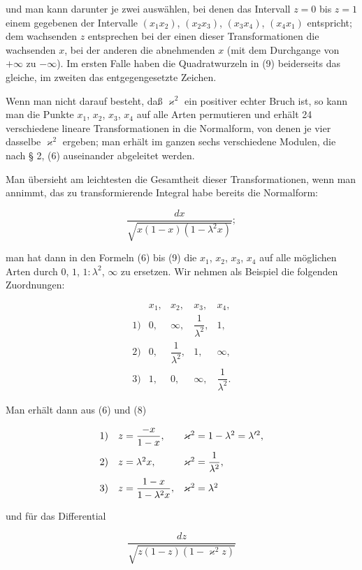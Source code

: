
und man kann darunter je zwei auswählen, bei denen das Intervall $z = 0$ bis $z = 1$ einem gegebenen der Intervalle $(x_1x_2)$, $(x_2x_3)$, $(x_3x_4)$, $(x_4x_1)$ entspricht; dem wachsenden $z$ entsprechen bei der einen dieser Transformationen die wachsenden $x$, bei der anderen die abnehmenden $x$ (mit dem Durchgange von $+\infty$ zu $-\infty$). Im ersten Falle haben die Quadratwurzeln in (9) beiderseits das gleiche, im zweiten das entgegengesetzte Zeichen.

Wenn man nicht darauf besteht, daß $\varkappa^2$ ein positiver echter Bruch ist, so kann man die Punkte $x_1$, $x_2$, $x_3$, $x_4$ auf alle Arten permutieren und erhält 24 verschiedene lineare Transformationen in die Normalform, von denen je vier dasselbe $\varkappa^2$ ergeben; man erhält im ganzen sechs verschiedene Modulen, die nach § 2, (6) auseinander abgeleitet werden.

Man übersieht am leichtesten die Gesamtheit dieser Transformationen, wenn man annimmt, das zu transformierende Integral habe bereits die Normalform:

\[
\dfrac{dx}{\sqrt{x(1-x)(1-\lambda^2x)}};
\]

man hat dann in den Formeln (6) bis (9) die $x_1$, $x_2$, $x_3$, $x_4$ auf alle möglichen Arten durch $0$, $1$, $1:\lambda^2$, $\infty$ zu ersetzen. Wir nehmen als Beispiel die folgenden Zuordnungen:

\[
\begin{array}{ccccc}
 & x_1, & x_2, & x_3, & x_4, \\\hline
1) & 0, & \infty, & \dfrac{1}{\lambda^2}, & 1, \\[10pt]
2) & 0, & \dfrac{1}{\lambda^2}, & 1, & \infty, \\[10pt]
3) & 1, & 0, & \infty, & \dfrac{1}{\lambda^2}.
\end{array}
\]

Man erhält dann aus (6) und (8)

\[
\begin{array}{c@{\quad}ll}
1) & z = \dfrac{-x}{1-x}, & \varkappa^2 = 1-\lambda^2 = \lambda'^2, \\[10pt]
2) & z = \lambda^2x, & \varkappa^2 = \dfrac{1}{\lambda^2}, \\[10pt]
3) & z = \dfrac{1-x}{1-\lambda^2x}, & \varkappa^2 = \lambda^2
\end{array}
\]

und für das Differential

\[
\dfrac{dz}{\sqrt{z(1-z)(1-\varkappa^2z)}}
\]
